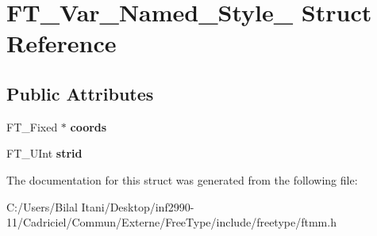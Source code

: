 \hypertarget{struct_f_t___var___named___style__}{}\section{F\+T\+\_\+\+Var\+\_\+\+Named\+\_\+\+Style\+\_\+ Struct Reference}
\label{struct_f_t___var___named___style__}
\subsection*{Public Attributes}
\begin{DoxyCompactItemize}
\item 
F\+T\+\_\+\+Fixed $\ast$ {\bfseries coords}\hypertarget{struct_f_t___var___named___style___a07195d55aee541db651ef3a8b04bb41f}{}\label{struct_f_t___var___named___style___a07195d55aee541db651ef3a8b04bb41f}

\item 
F\+T\+\_\+\+U\+Int {\bfseries strid}\hypertarget{struct_f_t___var___named___style___a7802f6958c6e883bdce16b9931002826}{}\label{struct_f_t___var___named___style___a7802f6958c6e883bdce16b9931002826}

\end{DoxyCompactItemize}


The documentation for this struct was generated from the following file\+:\begin{DoxyCompactItemize}
\item 
C\+:/\+Users/\+Bilal Itani/\+Desktop/inf2990-\/11/\+Cadriciel/\+Commun/\+Externe/\+Free\+Type/include/freetype/ftmm.\+h\end{DoxyCompactItemize}
